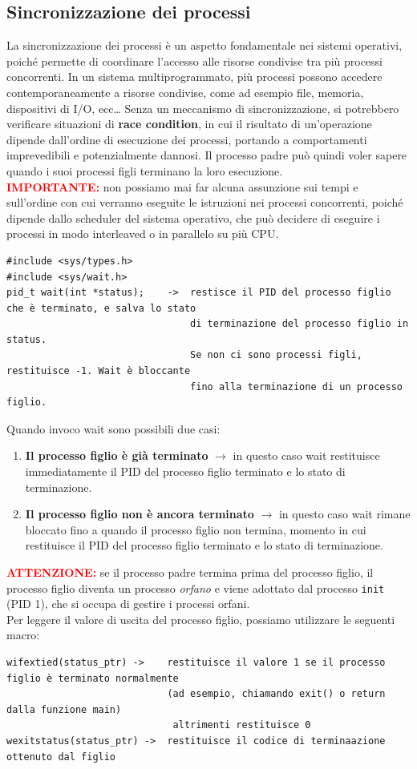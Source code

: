 \subsection{Sincronizzazione dei processi}
La sincronizzazione dei processi è un aspetto fondamentale nei sistemi operativi, poiché permette di coordinare l'accesso alle risorse condivise tra più processi concorrenti.
In un sistema multiprogrammato, più processi possono accedere contemporaneamente a risorse condivise, come ad esempio file, memoria, dispositivi di I/O, ecc\dots
Senza un meccanismo di sincronizzazione, si potrebbero verificare situazioni di \textbf{race condition}, in cui il risultato di un'operazione dipende dall'ordine di esecuzione dei processi, 
portando a comportamenti imprevedibili e potenzialmente dannosi. Il processo padre può quindi voler sapere quando i suoi processi figli terminano la loro esecuzione.\\
\textbf{\textcolor{red}{IMPORTANTE:}} non possiamo mai far alcuna assunzione sui tempi e sull'ordine con cui
verranno eseguite le istruzioni nei processi concorrenti, poiché dipende dallo scheduler del sistema operativo, che può decidere di eseguire i processi in modo interleaved o in parallelo su più CPU.
\begin{verbatim}
#include <sys/types.h>
#include <sys/wait.h>
pid_t wait(int *status);    ->  restisce il PID del processo figlio che è terminato, e salva lo stato 
                                di terminazione del processo figlio in status. 
                                Se non ci sono processi figli, restituisce -1. Wait è bloccante 
                                fino alla terminazione di un processo figlio.
\end{verbatim}
Quando invoco wait sono possibili due casi:
\begin{enumerate}
    \item \textbf{Il processo figlio è già terminato} $\rightarrow$ in questo caso wait restituisce immediatamente il PID 
    del processo figlio terminato e lo stato di terminazione.
    \item \textbf{Il processo figlio non è ancora terminato} $\rightarrow$ in questo caso wait rimane bloccato fino 
    a quando il processo figlio non termina, momento in cui restituisce il PID del processo figlio terminato e lo stato di terminazione.
\end{enumerate}
\textbf{\textcolor{red}{ATTENZIONE:}} se il processo padre termina prima del processo figlio, il processo figlio diventa un processo \textit{orfano} 
e viene adottato dal processo \texttt{init} (PID 1), che si occupa di gestire i processi orfani.\\
Per leggere il valore di uscita del processo figlio, possiamo utilizzare le seguenti macro:
\begin{verbatim}
wifextied(status_ptr) ->    restituisce il valore 1 se il processo figlio è terminato normalmente 
                            (ad esempio, chiamando exit() o return dalla funzione main)
                             altrimenti restituisce 0
wexitstatus(status_ptr) ->  restituisce il codice di terminaazione ottenuto dal figlio
\end{verbatim}
